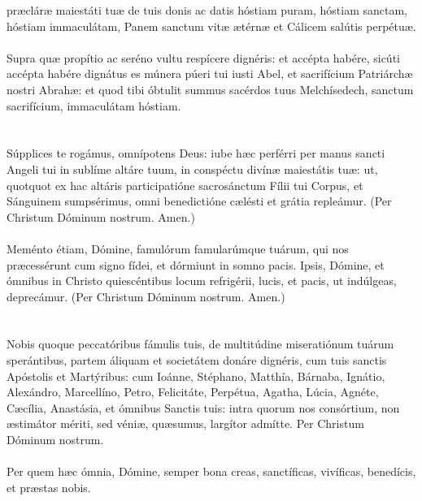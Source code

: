 \documentclass[12pt, a4paper]{article}
\begin{document}
	præcláræ maiestáti tuæ de tuis donis
	ac datis hóstiam puram, hóstiam
	sanctam, hóstiam immaculátam,
	Panem sanctum vitæ ætérnæ et
	Cálicem salútis perpétuæ.
	\\\\
	Supra quæ propítio ac seréno vultu
	respícere dignéris: et accépta
	habére, sicúti accépta habére
	dignátus es múnera púeri tui iusti
	Abel, et sacrifícium Patriárchæ
	nostri Abrahæ: et quod tibi óbtulit
	summus sacérdos tuus
	Melchísedech, sanctum sacrifícium,
	immaculátam hóstiam.
	\\\\
	\\
	Súpplices te rogámus, omnípotens
	Deus: iube hæc perférri per manus
	sancti Angeli tui in sublíme altáre tuum, in conspéctu divínæ
	maiestátis tuæ: ut, quotquot ex hac
	altáris participatióne sacrosánctum
	Fílii tui Corpus, et Sánguinem
	sumpsérimus, omni benedictióne
	cælésti et grátia repleámur. (Per
	Christum Dóminum nostrum.
	Amen.)
	\\\\
	Meménto étiam, Dómine,
	famulórum famularúmque tuárum,
	qui nos præcessérunt cum signo
	fídei, et dórmiunt in somno pacis.
	Ipsis, Dómine, et ómnibus in
	Christo quiescéntibus locum
	refrigérii, lucis, et pacis, ut
	indúlgeas, deprecámur. (Per
	Christum Dóminum nostrum.
	Amen.)
	\\\\
	\\
	Nobis quoque peccatóribus fámulis
	tuis, de multitúdine miseratiónum
	tuárum sperántibus, partem
	áliquam et societátem donáre
	dignéris, cum tuis sanctis Apóstolis
	et Martýribus: cum Ioánne,
	Stéphano, Matthía, Bárnaba,
	Ignátio, Alexándro, Marcellíno,
	Petro, Felicitáte, Perpétua, Agatha,
	Lúcia, Agnéte, Cæcília, Anastásia, et
	ómnibus Sanctis tuis: intra quorum
	nos consórtium, non æstimátor
	mériti, sed véniæ, quæsumus,
	largítor admítte. Per Christum
	Dóminum nostrum.
	\\\\
	Per quem hæc ómnia, Dómine,
	semper bona creas, sanctíficas,
	vivíficas, benedícis,
	et præstas nobis.
	\\\\
	
	\newpage
	
\end{document}
